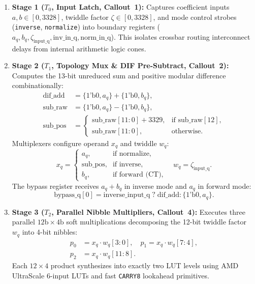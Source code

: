 \begin{enumerate}
    \item \textbf{Stage 1 ($T_0$, Input Latch, Callout~1):} Captures coefficient inputs $a, b \in [0, 3328]$, twiddle factor $\zeta \in [0, 3328]$, and mode control strobes (\texttt{inverse}, \texttt{normalize}) into boundary registers ($a_q, b_q, \zeta_{\text{input\_q}}, \text{inv\_in\_q}, \text{norm\_in\_q}$). This isolates crossbar routing interconnect delays from internal arithmetic logic cones.
    
    \item \textbf{Stage 2 ($T_1$, Topology Mux \& DIF Pre-Subtract, Callout~2):} Computes the 13-bit unreduced sum and positive modular difference combinationally:
    \begin{align}
    \label{eq:dif_add_sub}
    \text{dif\_add} &= \{1\text{'b0}, a_q\} + \{1\text{'b0}, b_q\}, \\
    \text{sub\_raw} &= \{1\text{'b0}, a_q\} - \{1\text{'b0}, b_q\}, \\
    \text{sub\_pos} &= \begin{cases}
    \text{sub\_raw}[11:0] + 3329, & \text{if } \text{sub\_raw}[12], \\
    \text{sub\_raw}[11:0], & \text{otherwise}.
    \end{cases}
    \end{align}
    Multiplexers configure operand $x_q$ and twiddle $w_q$:
    \begin{equation}
    \label{eq:stage2_muxes}
    x_q = \begin{cases}
    a_q, & \text{if normalize}, \\
    \text{sub\_pos}, & \text{if inverse}, \\
    b_q, & \text{if forward (CT)},
    \end{cases} \quad
    w_q = \zeta_{\text{input\_q}}.
    \end{equation}
    The bypass register receives $a_q+b_q$ in inverse mode and $a_q$ in forward mode:
    \begin{equation}
    \label{eq:bypass_init}
    \text{bypass\_q}[0] = \text{inverse\_input\_q} \; ? \; \text{dif\_add} : \{1\text{'b0}, a_q\}.
    \end{equation}

    \item \textbf{Stage 3 ($T_2$, Parallel Nibble Multipliers, Callout~4):} Executes three parallel $12\text{b} \times 4\text{b}$ soft multiplications decomposing the 12-bit twiddle factor $w_q$ into 4-bit nibbles:
    \begin{equation}
    \label{eq:p012_eval}
    \begin{aligned}
    p_0 &= x_q \cdot w_q[3:0], \quad p_1 = x_q \cdot w_q[7:4], \\
    p_2 &= x_q \cdot w_q[11:8].
    \end{aligned}
    \end{equation}
    Each $12\times 4$ product synthesizes into exactly two LUT levels using AMD UltraScale 6-input LUTs and fast \texttt{CARRY8} lookahead primitives.


\end{enumerate}
